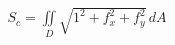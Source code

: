 \documentclass[preview]{standalone}
\begin{document}
\begin{align*}
S_c = \iint\limits_D \sqrt{1^2 + f_x^2 + f_y^2}\, dA
\end{align*}
\end{document}
